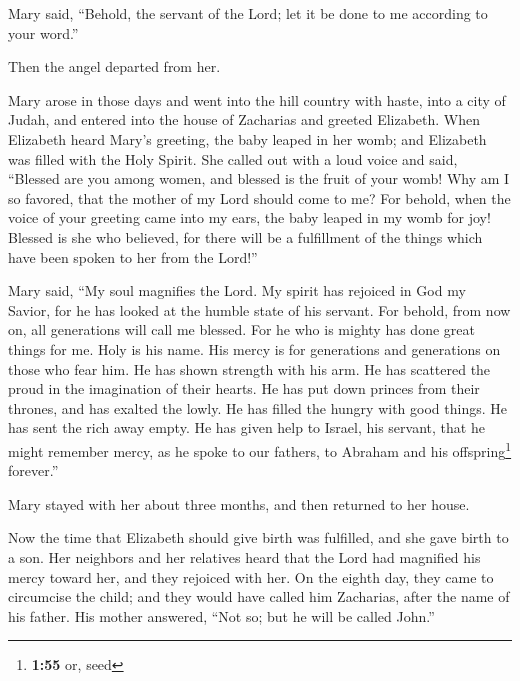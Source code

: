  Mary said, ``Behold, the servant of the Lord; let it be
done to me according to your word.''

Then the angel departed from her.

 Mary arose in those days and went into the hill country
with haste, into a city of Judah,  and entered into the
house of Zacharias and greeted Elizabeth.  When Elizabeth
heard Mary's greeting, the baby leaped in her womb; and Elizabeth was
filled with the Holy Spirit.  She called out with a loud
voice and said, ``Blessed are you among women, and blessed is the fruit
of your womb!  Why am I so favored, that the mother of my
Lord should come to me?  For behold, when the voice of
your greeting came into my ears, the baby leaped in my womb for joy!
 Blessed is she who believed, for there will be a
fulfillment of the things which have been spoken to her from the Lord!''

 Mary said, ``My soul magnifies the Lord. 
My spirit has rejoiced in God my Savior,  for he has
looked at the humble state of his servant. For behold, from now on, all
generations will call me blessed.  For he who is mighty
has done great things for me. Holy is his name.  His
mercy is for generations and generations on those who fear him.
 He has shown strength with his arm. He has scattered the
proud in the imagination of their hearts.  He has put
down princes from their thrones, and has exalted the lowly.
 He has filled the hungry with good things. He has sent
the rich away empty.  He has given help to Israel, his
servant, that he might remember mercy,  as he spoke to
our fathers, to Abraham and his offspring\footnote{\textbf{1:55} or,
  seed} forever.''

 Mary stayed with her about three months, and then
returned to her house.

 Now the time that Elizabeth should give birth was
fulfilled, and she gave birth to a son.  Her neighbors
and her relatives heard that the Lord had magnified his mercy toward
her, and they rejoiced with her.  On the eighth day, they
came to circumcise the child; and they would have called him Zacharias,
after the name of his father.  His mother answered, ``Not
so; but he will be called John.''

